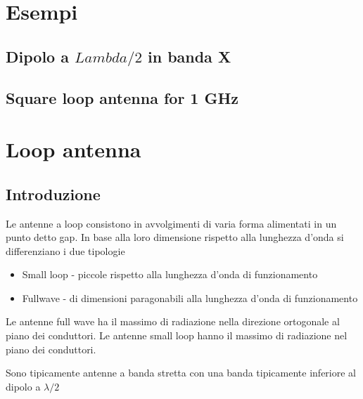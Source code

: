 \documentclass[10pt,a4paper]{book}
\begin{document}
\section{Esempi}
\subsection{Dipolo a $Lambda/2$ in banda X}


\subsection{Square loop antenna for 1 GHz}


\section{Loop antenna}
\subsection{Introduzione}
Le antenne a loop consistono in avvolgimenti di varia forma alimentati in un punto detto gap.  In base alla loro dimensione rispetto alla lunghezza d'onda si differenziano i due tipologie

\begin{itemize}
\item Small loop - piccole rispetto alla lunghezza d'onda di funzionamento
\item Fullwave  - di dimensioni paragonabili alla lunghezza d'onda di funzionamento
\end{itemize}

Le antenne full wave ha il massimo di radiazione nella direzione ortogonale al piano dei conduttori. Le antenne small loop hanno il massimo di radiazione nel piano dei conduttori.

Sono tipicamente antenne a banda stretta con una banda tipicamente inferiore al dipolo a $\lambda/2$
\end{document}

